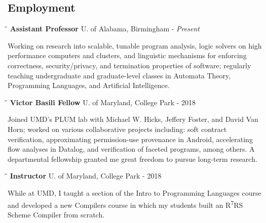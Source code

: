 \documentclass[line]{res}
\begin{document}
\begin{resume}
\section{\large Employment}
   \vspace{-0.05in}  
   \begin{tabbing}
    \hspace{2.25in}\= \hspace{2.25in}\= \kill %
    {\bf Assistant Professor} \>U. of Alabama, Birmingham   - \textit{Present}
   \end{tabbing}\vspace{-0.5cm}      %
   Working on research into scalable, tunable program analysis, logic solvers on high performance computers and clusters, and linguistic mechanisms for enforcing correctness, security/privacy, and termination properties of software; regularly teaching undergraduate and graduate-level classes in Automata Theory, Programming Languages, and Artificial Intelligence. 
   \vspace{-0.2cm}  
   \begin{tabbing}
    \hspace{2.25in}\= \hspace{2.25in}\= \kill %
    {\bf Victor Basili Fellow} \>U. of Maryland, College Park   - 2018
   \end{tabbing}\vspace{-0.5cm}      %
   Joined UMD's PLUM lab with Michael W. Hicks, Jeffery Foster, and David Van Horn; worked on various collaborative projects including: soft contract verification, approximating permission-use provenance in Android, accelerating flow analyses in Datalog, and verification of faceted programs, among others. A departmental fellowship granted me great freedom to pursue long-term research.
   \vspace{-0.2cm}  
   \begin{tabbing}
    \hspace{2.25in}\= \hspace{2.25in}\= \kill %
    {\bf Instructor} \>U. of Maryland, College Park   - 2018
   \end{tabbing}\vspace{-0.5cm}      %
   While at UMD, I taught a section of the Intro to Programming Languages course and developed a new Compilers course in which my students built an R\textsuperscript{7}RS Scheme Compiler from scratch. 

\end{resume}
\end{document}
